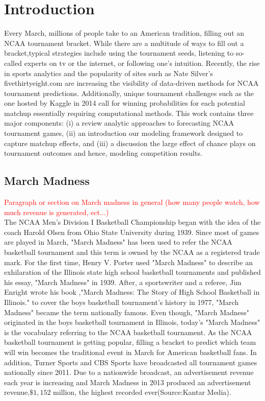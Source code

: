 \section{Introduction}

 Every March, millions of people take to an American tradition, filling out an NCAA tournament bracket.  While there are a multitude of ways to fill out a bracket,typical strategies include using the tournament seeds, listening to so-called experts on tv or the internet, or following one's intuition.  Recently, the rise in sports analytics and the popularity of sites such as Nate Silver's fivethirtyeight.com are increasing the visibility of data-driven methods for NCAA tournament predictions.  Additionally, unique tournament challenges such as the one hosted by Kaggle in 2014 call for winning probabilities for each potential matchup essentially requiring computational methods.  This work contains three major components: (i) a review analytic approaches to forecasting NCAA tournament games, (ii) an introduction our modeling framework designed to capture matchup effects, and (iii) a discussion the large effect of chance plays on tournament outcomes and hence, modeling competition results.

\subsection{March Madness}
 \textcolor{red}{Paragraph or section on March madness in general (how many people watch, how much revenue is generated, ect...)}\\
 The NCAA Men's Division I Basketball Championship began with the idea of the coach Harold Olsen from Ohio State University during 1939. Since most of games are played in March, "March Madness" has been used to refer the NCAA basketball tournament and this term is owned by the NCAA as a registered trade mark.
 For the first time, Henry V. Porter used "March Madness" to describe an exhilaration of the Illinois state high school basketball tournaments and published his essay, "March Madness" in 1939.  After, a sportswriter and a referee, Jim Enright wrote his book ,"March Madness: The Story of High School Basketball in Illinois." to cover the boys basketball tournament's history in 1977, "March Madness" became the term nationally famous.  Even though, "March Madness"  originated in the boys basketball tournament in Illinois, today's "March Madness" is the vocabulary referring to the NCAA basketball tournament.
As the NCAA basketball tournament is getting popular, filling a bracket to predict which team will win becomes the traditional event in March for American basketball fans. In addition, Turner Sports and CBS Sports have broadcasted all tournament games nationally since 2011. Due to a nationwide broadcast, an advertisement revenue each year is increasing and March Madness in 2013 produced an advertisement revenue,$\$ 1,152$ million, the highest recorded ever(Source:Kantar Media).

